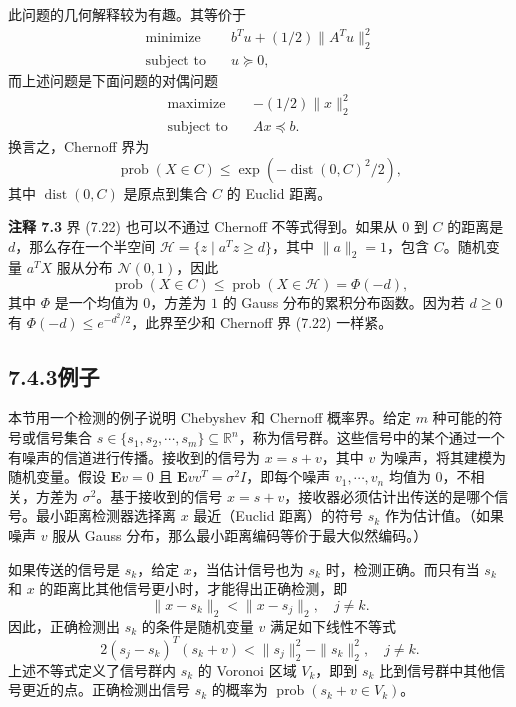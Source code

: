 \documentclass[UTF8, 12pt, fontset=fandol, oneside]{ctexart}
\begin{document}
此问题的几何解释较为有趣。其等价于
\[
\begin{aligned}
\text{minimize}\quad & b^Tu+(1/2)\|A^Tu\|_2^2\\
\text{subject to}\quad & u\succeq 0,
\end{aligned}
\]
而上述问题是下面问题的对偶问题
\[
\begin{aligned}
\text{maximize}\quad & -(1/2)\|x\|_2^2\\
\text{subject to}\quad & Ax\preceq b.
\end{aligned}
\]
换言之，Chernoff 界为
\begin{equation}
\operatorname{prob}(X\in C)\leq \exp(-\operatorname{dist}(0,C)^2/2),
\tag{7.22}
\end{equation}
其中 $\operatorname{dist}(0,C)$ 是原点到集合 $C$ 的 Euclid 距离。

\noindent\textbf{注释 7.3}\quad
界 (7.22) 也可以不通过 Chernoff 不等式得到。如果从 $0$ 到 $C$ 的距离是 $d$，那么存在一个半空间 $\mathcal{H}=\{z\mid a^Tz\geq d\}$，其中 $\|a\|_2=1$，包含 $C$。随机变量 $a^TX$ 服从分布 $\mathcal{N}(0,1)$，因此
\[
\operatorname{prob}(X\in C)\leq\operatorname{prob}(X\in\mathcal{H})=\Phi(-d),
\]
其中 $\Phi$ 是一个均值为 $0$，方差为 $1$ 的 Gauss 分布的累积分布函数。因为若 $d\geq 0$ 有 $\Phi(-d)\leq e^{-d^2/2}$，此界至少和 Chernoff 界 (7.22) 一样紧。

\subsection*{7.4.3\quad 例子}

本节用一个检测的例子说明 Chebyshev 和 Chernoff 概率界。给定 $m$ 种可能的符号或信号集合 $s\in\{s_1,s_2,\cdots,s_m\}\subseteq\mathbb{R}^n$，称为信号群。这些信号中的某个通过一个有噪声的信道进行传播。接收到的信号为 $x=s+v$，其中 $v$ 为噪声，将其建模为随机变量。假设 $\mathbf{E}v=0$ 且 $\mathbf{E}vv^T=\sigma^2I$，即每个噪声 $v_1,\cdots,v_n$ 均值为 $0$，不相关，方差为 $\sigma^2$。基于接收到的信号 $x=s+v$，接收器必须估计出传送的是哪个信号。最小距离检测器选择离 $x$ 最近（Euclid 距离）的符号 $s_k$ 作为估计值。（如果噪声 $v$ 服从 Gauss 分布，那么最小距离编码等价于最大似然编码。）

如果传送的信号是 $s_k$，给定 $x$，当估计信号也为 $s_k$ 时，检测正确。而只有当 $s_k$ 和 $x$ 的距离比其他信号更小时，才能得出正确检测，即
\[
\|x-s_k\|_2<\|x-s_j\|_2,\quad j\neq k.
\]
因此，正确检测出 $s_k$ 的条件是随机变量 $v$ 满足如下线性不等式
\[
2(s_j-s_k)^T(s_k+v)<\|s_j\|_2^2-\|s_k\|_2^2,\quad j\neq k.
\]
上述不等式定义了信号群内 $s_k$ 的 Voronoi 区域 $V_k$，即到 $s_k$ 比到信号群中其他信号更近的点。正确检测出信号 $s_k$ 的概率为 $\operatorname{prob}(s_k+v\in V_k)$。
\end{document}
